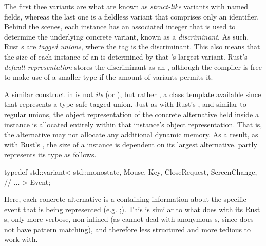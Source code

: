 The first thee variants are what are known as \textit{struct-like} variants
with named fields, whereas the last one is a fieldless variant that comprises
only an identifier\cite{therustreference}. Behind the scenes, each 
instance has an associated integer that is used to determine the underlying
concrete variant, known as a \textit{discriminant}\cite{therustreference}.
As such, Rust s are \textit{tagged unions}, where the tag is the
discriminant. This also means that the size of each instance of an 
is determined by that 's largest variant. Rust's \textit{default
representation} stores the discriminant as an , although the
compiler is free to make use of a smaller type if the amount of variants permits
it\cite{therustreference}.



A similar construct in \cpp is not \textit{its}  (or ), but rather , a class template available since
 that represents a type-safe tagged union\cite{cppstd}. Just as with
Rust's , and similar to regular unions, the object representation
of the concrete alternative held inside a  instance is
allocated entirely within that instance's object representation\cite{cppstd}.
That is, the alternative may not allocate any additional dynamic
memory\cite{cppstd}. As a result, as with Rust's , the
size of a  instance is dependent on its largest
alternative\cite{cppstd}. \wmcpp partly represents its  type as
follows.

\begin{cppblock}
  typedef std::variant<
    std::monostate,
    Mouse,
    Key,
    CloseRequest,
    ScreenChange,
    // ...
  > Event;
\end{cppblock}

Here, each concrete alternative is a \cpp {} containing information
about the specific event that is being represented (e.g. 
;). This is similar to what \wmrs does with its
Rust s, only more verbose, non-inlined (as 
cannot deal with anonymous s, since \cpp does not have pattern
matching), and therefore less structured and more tedious to work with.


